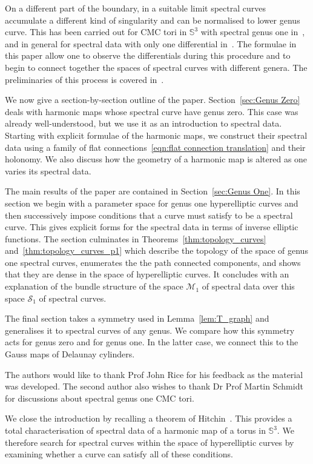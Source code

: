 \documentclass{article}
\numberwithin{equation}{section}
\numberwithin{figure}{section}
\renewcommand{\S}{\mathbb{S}}
\begin{document}
On a different part of the boundary, in a suitable limit spectral curves accumulate a different kind of singularity and can be normalised to lower genus curve. This has been carried out for CMC tori in $\S^3$ with spectral genus one in~\cite{Kilian2015}, and in general for spectral data with only one differential in~\cite{Hauswirth2017arxiv}. The formulae in this paper allow one to observe the differentials during this procedure and to begin to connect together the spaces of spectral curves with different genera. The preliminaries of this process is covered in~\cite[Section~4.2]{Ogilvie2017}. 

We now give a section-by-section outline of the paper. Section~\ref{sec:Genus Zero} deals with harmonic maps whose spectral curve have genus zero. This case was already well-understood, but we use it as an introduction to spectral data. Starting with explicit formulae of the harmonic maps, we construct their spectral data using a family of flat connections~\eqref{eqn:flat connection translation} and their holonomy.
We also discuss how the geometry of a harmonic map is altered as one varies its spectral data.

The main results of the paper are contained in Section~\ref{sec:Genus One}. In this section we begin with a parameter space for genus one hyperelliptic curves and then successively impose conditions that a curve must satisfy to be a spectral curve. This gives explicit forms for the spectral data in terms of inverse elliptic functions.
The section culminates in Theorems~\ref{thm:topology_curves} and~\ref{thm:topology_curves_p1} which describe the topology of the space of genus one spectral curves, enumerates the the path connected components, and shows that they are dense in the space of hyperelliptic curves. It concludes with an explanation of the bundle structure of the space $\mathcal{M}_1$ of spectral data over this space $\mathcal{S}_1$ of spectral curves.

The final section takes a symmetry used in Lemma~\ref{lem:T_graph} and generalises it to spectral curves of any genus. We compare how this symmetry acts for genus zero and for genus one. In the latter case, we connect this to the Gauss maps of Delaunay cylinders.

The authors would like to thank Prof John Rice for his feedback as the material was developed. The second author also wishes to thank Dr Prof Martin Schmidt for discussions about spectral genus one CMC tori.

We close the introduction by recalling a theorem of Hitchin~\cite[Theorem~8.1]{Hitchin1990}. This provides a total characterisation of spectral data of a harmonic map of a torus in $\S^3$. We therefore search for spectral curves within the space of hyperelliptic curves by examining whether a curve can satisfy all of these conditions.
\end{document}
